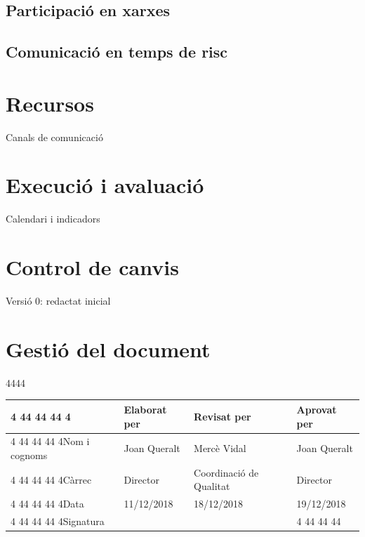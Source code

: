 \documentclass[fontsize=10pt,%
 4444paper=a4,%
 4444%
 4444%
 4444DIV=14,%
 4444twoside,%
 4444pagesize=auto,%
 4444%
 4444parskip=half,
 4444%
 4444captions=tableheading,%
 4444numbers=noenddot,%
 4444toc=graduated%
 4444%
]{scrartcl}
\begin{document}
\subsection{Participació en xarxes}

\subsection{Comunicació en temps de risc}

\section{Recursos}\label{sec:recursos}

Canals de comunicació

\section{Execució i avaluació}\label{sec:execiaval}

Calendari i indicadors



\section{Control de canvis}

Versió 0: redactat inicial

\section{Gestió del document}\label{sec:gestiodoc}


\begin{center}\scriptsize{}\renewcommand{\arraystretch}{1.75}%
 4444\begin{tabular}{lllp{4cm}}\hline
 4 44 44 44 4              & Elaborat per & Revisat per             & Aprovat per  \\ \hline
 4 44 44 44 4Nom i cognoms & Joan Queralt & Mercè Vidal             & Joan Queralt \\
 4 44 44 44 4Càrrec        & Director     & Coordinació de Qualitat & Director     \\
 4 44 44 44 4Data          & 11/12/2018   & 18/12/2018              & 19/12/2018   \\\hline
 4 44 44 44 4Signatura     &              &                         &              
 4 44 44 44\end{tabular}
\end{center}
\end{document}
